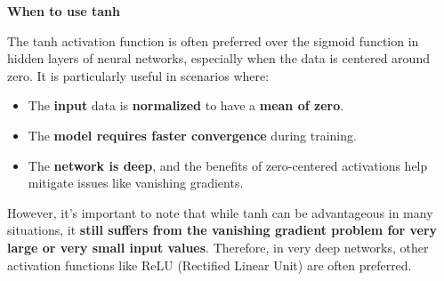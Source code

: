 \highspace
\begin{flushleft}
    \textcolor{Green3}{ \textbf{When to use tanh}}
\end{flushleft}
The tanh activation function is often preferred over the sigmoid function in hidden layers of neural networks, especially when the data is centered around zero. It is particularly useful in scenarios where:
\begin{itemize}
    \item The \textbf{input} data is \textbf{normalized} to have a \textbf{mean of zero}.
    \item The \textbf{model requires faster convergence} during training.
    \item The \textbf{network is deep}, and the benefits of zero-centered activations help mitigate issues like vanishing gradients.
\end{itemize}
However, it's important to note that while tanh can be advantageous in many situations, it \textbf{still suffers from the vanishing gradient problem for very large or very small input values}. Therefore, in very deep networks, other activation functions like ReLU (Rectified Linear Unit) are often preferred.